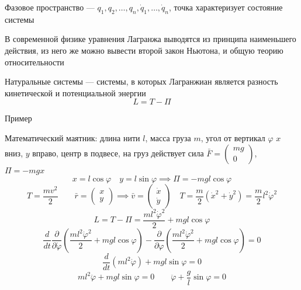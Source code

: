 \documentclass[crop=false]{standalone}
\begin{document}
\Def Фазовое пространство — $q_1 , q_2, \dots, q_n , \dot q_1, \dots, \dot q_n$, точка характеризует состояние системы

В современной физике уравнения Лагранжа выводятся из принципа наименьшего действия, из него же можно вывести второй закон Ньютона, и общую теорию относительности

\Def Натуральные системы — системы, в которых Лагранжиан является разность кинетической и потенциальной энергии
\[L = T - \Pi\]

\keypoint Пример

Математический маятник: длина нити $l$, масса груза $m$, угол от вертикал $\varphi$
$x$ вниз, $y$ вправо, центр в подвесе, на груз действует сила $\bar F = \begin{pmatrix}
    mg \\ 0
\end{pmatrix}$, $\Pi = - mgx$
\[x = l \cos \varphi \quad y = l \sin \varphi \implies \Pi = - m g l \cos \varphi\]
\[T = \frac{m v^2}{2} \qquad \bar r = \begin{pmatrix}
    x \\ y
\end{pmatrix} \implies \bar v = \begin{pmatrix}
    \dot x \\ \dot y
\end{pmatrix} \quad T = \frac{m}{2} \left(\dot x^2 + \dot y^2\right) = \frac{m}{2} l^2 \dot \varphi^2\]
\[L = T - \Pi = \frac{m l^2 \dot \varphi^2}{2} + m g l \cos \varphi\]
\[\frac{d}{d t} \frac{\partial}{\partial \dot \varphi} \left(\frac{m l^2 \dot \varphi^2}{2} + m g l \cos \varphi\right) - \frac{\partial }{\partial \varphi} \left( \frac{m l^2 \dot \varphi^2}{2} + m g l \cos \varphi \right) = 0\]
\[\frac{d}{d t} (m l^2 \dot \varphi) + m g l \sin \varphi = 0\]
\[m l^2 \ddot \varphi + m g l \sin \varphi = 0 \qquad \ddot \varphi + \frac{g}{l} \sin \varphi = 0\]
\end{document}
